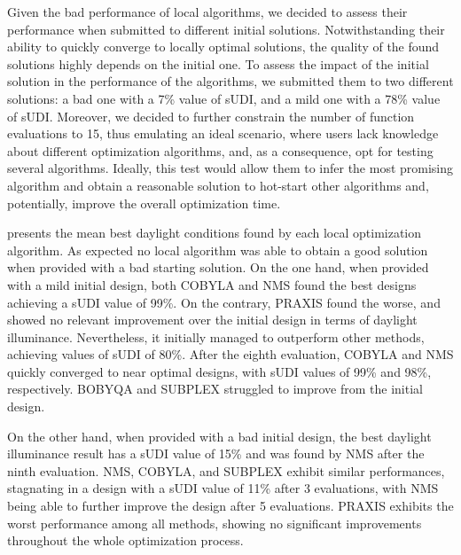 Given the bad performance of local algorithms, we decided to assess their performance when submitted to different initial solutions. Notwithstanding their ability to quickly converge to locally optimal solutions, the quality of the found solutions highly depends on the initial one. To assess the impact of the initial solution in the performance of the algorithms, we submitted them to two different solutions: a bad one with a 7\% value of \ac{sUDI}, and a mild one with a 78\% value of \ac{sUDI}. Moreover, we decided to further constrain the number of function evaluations to 15, thus emulating an ideal scenario, where users lack knowledge about different optimization algorithms, and, as a consequence, opt for testing several algorithms. Ideally, this test would allow them to infer the most promising algorithm and obtain a reasonable solution to hot-start other algorithms and, potentially, improve the overall optimization time.

 presents the mean best daylight conditions found by each local optimization algorithm. As expected no local algorithm was able to obtain a good solution when provided with a bad starting solution. On the one hand, when provided with a mild initial design, both COBYLA and NMS found the best designs achieving a \ac{sUDI} value of 99\%. On the contrary, PRAXIS found the worse, and showed no relevant improvement over the initial design in terms of daylight illuminance. Nevertheless, it initially managed to outperform other methods, achieving values of \ac{sUDI} of 80\%. After the eighth evaluation, COBYLA and NMS quickly converged to near optimal designs, with \ac{sUDI} values of 99\% and 98\%, respectively. BOBYQA and SUBPLEX struggled to improve from the initial design.

On the other hand, when provided with a bad initial design, the best daylight illuminance result has a \ac{sUDI} value of 15\% and was found by NMS after the ninth evaluation. NMS, COBYLA, and SUBPLEX exhibit similar performances, stagnating in a design with a \ac{sUDI} value of 11\% after 3 evaluations, with NMS being able to further improve the design after 5 evaluations. PRAXIS exhibits the worst performance among all methods, showing no significant improvements throughout the whole optimization process.

